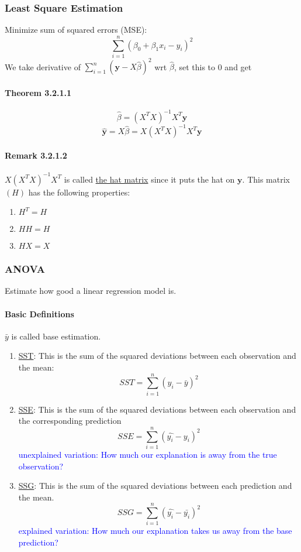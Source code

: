\documentclass[11pt]{article}
\newcommand{\tb}[1]{\textbf{#1}}
\newcommand{\under}[1]{\underline{#1}}
\newcommand{\vy}[0]{\tb{y}}
\begin{document}
\subsubsection{Least Square Estimation}
Minimize sum of squared errors (MSE): $$\sum_{i=1}^n (\beta_0 + \beta_1 x_i - y_i)^2$$
We take derivative of $\sum_{i=1}^n (\vy - X\hat{\beta})^2$ wrt $\hat{\beta}$, set this to 0 and get 
\paragraph{Theorem 3.2.1.1}$$\hat{\beta} = (X^TX)^{-1}X^T\vy$$
$$\hat{\vy} = X\hat{\beta} = X(X^TX)^{-1}X^T\vy$$
\paragraph{Remark 3.2.1.2}
$X(X^TX)^{-1}X^T$ is called \under{the hat matrix} since it puts the hat on $\vy$. This matrix $(H)$ has the following properties:
\begin{enumerate}
    \item $H^T = H$
    \item $HH = H$
    \item $HX = X$
\end{enumerate}
\subsubsection{ANOVA}
Estimate how good a linear regression model is.
\paragraph{Basic Definitions}
$\bar{y}$ is called base estimation.
\begin{enumerate}
	\item \under{SST}: This is the sum of the squared deviations between each observation and the mean:
	$$SST = \sum_{i=1}^n(y_{i}-\bar{y})^2$$
	\item \under{SSE}: This is the sum of the squared deviations between each observation and the corresponding prediction
	$$SSE = \sum_{i=1}^n(\hat{y_i} - y_i)^2$$
	\textcolor{blue}{unexplained variation: How much our explanation is away from the true observation?}
	\item \under{SSG}: This is the sum of the squared deviations between each prediction and the mean.
	$$SSG = \sum_{i=1}^n(\hat{y_i}-\bar{y_i})^2$$
	\textcolor{blue}{explained variation: How much our explanation takes us away from the base prediction?}
\end{enumerate}
\end{document}
